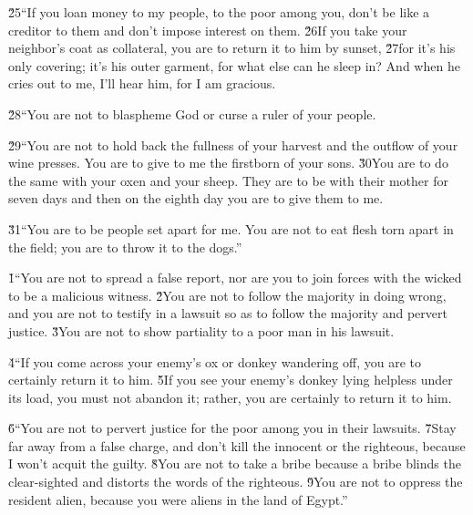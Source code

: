 \v{25}``If you loan money to my people, to the poor among you, don't be like a creditor to them and don't impose interest on them. \v{26}If you take your neighbor's coat as collateral, you are to return it to him by sunset, \v{27}for it's his only covering; it's his outer garment, for what else can he sleep in? And when he cries out to me, I'll hear him, for I am gracious.

\v{28}``You are not to blaspheme God or curse a ruler of your people.

\v{29}``You are not to hold back the fullness of your harvest and the outflow of your wine presses. You are to give to me the firstborn of your sons. \v{30}You are to do the same with your oxen and your sheep. They are to be with their mother for seven days and then on the eighth day you are to give them to me.

\v{31}``You are to be people set apart for me. You are not to eat flesh torn apart in the field; you are to throw it to the dogs.''

\v{1}``You are not to spread a false report, nor are you to join forces with the wicked to be a malicious witness. \v{2}You are not to follow the majority in doing wrong, and you are not to testify in a lawsuit so as to follow the majority and pervert justice. \v{3}You are not to show partiality to a poor man in his lawsuit.

\v{4}``If you come across your enemy's ox or donkey wandering off, you are to certainly return it to him. \v{5}If you see your enemy's donkey lying helpless under its load, you must not abandon it; rather, you are certainly to return it to him.

\v{6}``You are not to pervert justice for the poor among you in their lawsuits. \v{7}Stay far away from a false charge, and don't kill the innocent or the righteous, because I won't acquit the guilty. \v{8}You are not to take a bribe because a bribe blinds the clear-sighted and distorts the words of the righteous. \v{9}You are not to oppress the resident alien, because you were aliens in the land of Egypt.''

